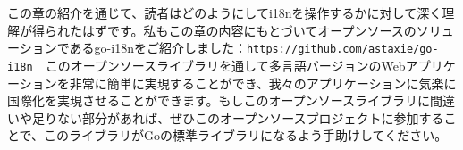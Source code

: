 この章の紹介を通じて、読者はどのようにしてi18nを操作するかに対して深く理解が得られたはずです。私もこの章の内容にもとづいてオープンソースのソリューションであるgo-i18nをご紹介しました：\texttt{https://github.com/astaxie/go-i18n}　このオープンソースライブラリを通して多言語バージョンのWebアプリケーションを非常に簡単に実現することができ、我々のアプリケーションに気楽に国際化を実現させることができます。もしこのオープンソースライブラリに間違いや足りない部分があれば、ぜひこのオープンソースプロジェクトに参加することで、このライブラリがGoの標準ライブラリになるよう手助けしてください。
